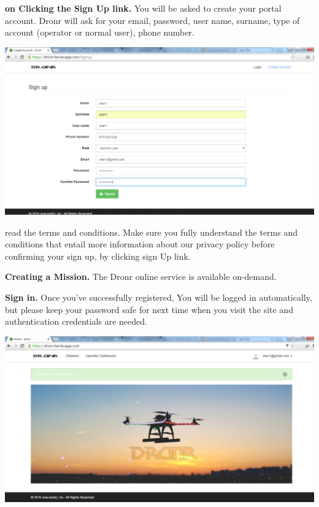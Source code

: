 \documentclass{article}
\begin{document}
		\begin{useritems}
			
			\item {\bfseries on Clicking the Sign Up link.} You will be asked to  create your  portal account. Dronr will ask for your email, password, user name, surname, type of account (operator or normal user), phone number.
			
			\includegraphics[width=1\textwidth]{./image/SignUp.png}\\[0.4cm]
			
			
			\item read the terms and conditions. Make sure you fully understand the terms and conditions that entail more information about our privacy policy before confirming your sign up, by clicking sign Up link. 
			
			\item {\bfseries Creating a Mission.} The Dronr online service is available on-demand.
			
			\item {\bfseries Sign in.} Once you've successfully registered, You will be logged in automatically, but please keep your password safe for next time when you visit the site and authentication credentials are needed.  
			
			\includegraphics[width=1\textwidth]{./image/LoggedIn.png}\\[0.4cm]			
			

\end{useritems}
\end{document}
